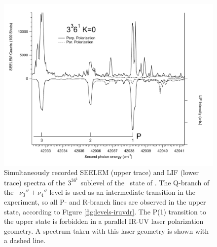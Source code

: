 \documentclass[12pt]{mitthesis}
\begin{document}
\begin{figure}
  \caption{Simultaneously recorded SEELEM (upper trace) and LIF (lower
    trace) spectra of the $3^36^1$  sublevel of the \astate\
    state of .  The Q-branch of the \xstate\ $\nu_3'' +
    \nu_4''$ level is used as an intermediate transition in the
    experiment, so all P- and R-branch lines are observed in the upper
    state, according to Figure \ref{fig:levels-iruvdr}.  The P(1)
    transition to the upper state is forbidden in a parallel IR-UV
    laser polarization geometry.  A spectrum taken with this laser
    geometry is shown with a dashed line.}
  \label{fig:3361-p1}
  \centering
  \includegraphics[width=7.3in,angle=90]{spectrum-3361-p1.pdf}
\end{figure}
\end{document}
